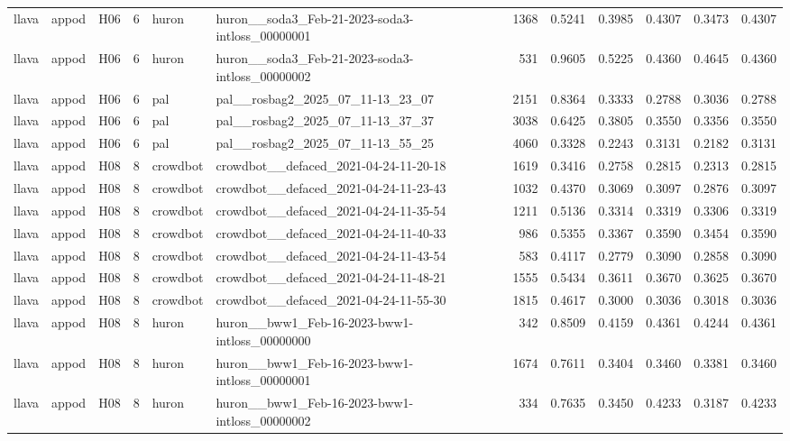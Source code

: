 \begin{table}[tbp]
\begin{tabular}{lllrllrrrrrr}
llava & appod & H06 & 6 & huron & huron\_\_soda3\_Feb-21-2023-soda3-intloss\_00000001 & 1368 & 0.5241 & 0.3985 & 0.4307 & 0.3473 & 0.4307 \\
llava & appod & H06 & 6 & huron & huron\_\_soda3\_Feb-21-2023-soda3-intloss\_00000002 & 531 & 0.9605 & 0.5225 & 0.4360 & 0.4645 & 0.4360 \\
llava & appod & H06 & 6 & pal & pal\_\_rosbag2\_2025\_07\_11-13\_23\_07 & 2151 & 0.8364 & 0.3333 & 0.2788 & 0.3036 & 0.2788 \\
llava & appod & H06 & 6 & pal & pal\_\_rosbag2\_2025\_07\_11-13\_37\_37 & 3038 & 0.6425 & 0.3805 & 0.3550 & 0.3356 & 0.3550 \\
llava & appod & H06 & 6 & pal & pal\_\_rosbag2\_2025\_07\_11-13\_55\_25 & 4060 & 0.3328 & 0.2243 & 0.3131 & 0.2182 & 0.3131 \\
llava & appod & H08 & 8 & crowdbot & crowdbot\_\_defaced\_2021-04-24-11-20-18 & 1619 & 0.3416 & 0.2758 & 0.2815 & 0.2313 & 0.2815 \\
llava & appod & H08 & 8 & crowdbot & crowdbot\_\_defaced\_2021-04-24-11-23-43 & 1032 & 0.4370 & 0.3069 & 0.3097 & 0.2876 & 0.3097 \\
llava & appod & H08 & 8 & crowdbot & crowdbot\_\_defaced\_2021-04-24-11-35-54 & 1211 & 0.5136 & 0.3314 & 0.3319 & 0.3306 & 0.3319 \\
llava & appod & H08 & 8 & crowdbot & crowdbot\_\_defaced\_2021-04-24-11-40-33 & 986 & 0.5355 & 0.3367 & 0.3590 & 0.3454 & 0.3590 \\
llava & appod & H08 & 8 & crowdbot & crowdbot\_\_defaced\_2021-04-24-11-43-54 & 583 & 0.4117 & 0.2779 & 0.3090 & 0.2858 & 0.3090 \\
llava & appod & H08 & 8 & crowdbot & crowdbot\_\_defaced\_2021-04-24-11-48-21 & 1555 & 0.5434 & 0.3611 & 0.3670 & 0.3625 & 0.3670 \\
llava & appod & H08 & 8 & crowdbot & crowdbot\_\_defaced\_2021-04-24-11-55-30 & 1815 & 0.4617 & 0.3000 & 0.3036 & 0.3018 & 0.3036 \\
llava & appod & H08 & 8 & huron & huron\_\_bww1\_Feb-16-2023-bww1-intloss\_00000000 & 342 & 0.8509 & 0.4159 & 0.4361 & 0.4244 & 0.4361 \\
llava & appod & H08 & 8 & huron & huron\_\_bww1\_Feb-16-2023-bww1-intloss\_00000001 & 1674 & 0.7611 & 0.3404 & 0.3460 & 0.3381 & 0.3460 \\
llava & appod & H08 & 8 & huron & huron\_\_bww1\_Feb-16-2023-bww1-intloss\_00000002 & 334 & 0.7635 & 0.3450 & 0.4233 & 0.3187 & 0.4233 \\

\end{tabular}
\end{table}
